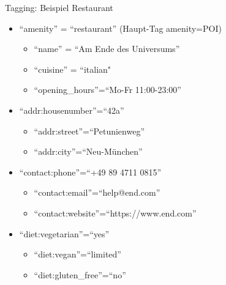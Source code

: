 \documentclass{beamer}
\begin{document}
\begin{frame}{Tagging: Beispiel Restaurant}

\begin{itemize}
  \item ``amenity'' = ``restaurant'' (Haupt-Tag amenity=POI)
	  \begin{itemize}
			   
\pause
  \item ``name'' = ``Am Ende des Universums''
\pause
  \item ``cuisine'' = ``italian"
\pause
  \item ``opening\_hours''=``Mo-Fr 11:00-23:00''
	  \end{itemize}

\pause
  \item ``addr:housenumber''=``42a''
	  \begin{itemize}
  \item ``addr:street''=``Petunienweg''
  \item ``addr:city''=``Neu-München''
	  \end{itemize}

\pause
  \item ``contact:phone''=``+49 89 4711 0815''
	  \begin{itemize}
  \item ``contact:email''=``help@end.com''
  \item ``contact:website''=``https://www.end.com''
	  \end{itemize}

\pause
  \item ``diet:vegetarian''=``yes''
	  \begin{itemize}
  \item ``diet:vegan''=``limited''
  \item ``diet:gluten\_free''=``no''
	  \end{itemize}
\end{itemize}

\end{frame}
\end{document}
